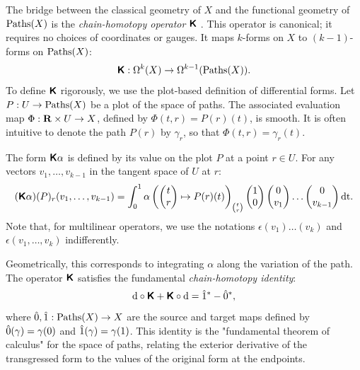   \begin{article}
    \label{subsec:The Chain-Homotopy Operator}
    The bridge between the classical geometry of $X$ and the functional geometry of $\operatorname{Paths}(X)$ is the \emph{chain-homotopy operator} $\boldsymbol{\mathsf{K}}$ \cite{PIZ13}.
    This operator is canonical;
    it requires no choices of coordinates or gauges.
    It maps $k$-forms on $X$ to $(k-1)$-forms on $\operatorname{Paths}(X)$:
    \[
      \boldsymbol{\mathsf{K}} : \Omega^k(X) \to \Omega^{k-1}(\operatorname{Paths}(X)).
      \]
    To define $\boldsymbol{\mathsf{K}}$ rigorously,
    we use the plot-based definition of differential forms.
    Let $P: U \to \operatorname{Paths}(X)$ be a plot of the space of paths.
    The associated evaluation map $\Phi: {\mathbf{R}} \times U \to X$,
    defined by $\Phi(t,r) = P(r)(t)$,
    is smooth.
    It is often intuitive to denote the path $P(r)$ by $\gamma_r$,
    so that $\Phi(t,r) = \gamma_r(t)$.
    
    The form $\boldsymbol{\mathsf{K}}\alpha$ is defined by its value on the plot $P$ at a point $r \in U$.
    For any vectors $v_1, \dots, v_{k-1}$ in the tangent space of $U$ at $r$:
    \[
      (\boldsymbol{\mathsf{K}}\alpha)(P)_r(v_1, \dots, v_{k-1}) = \int_0^1 \alpha\left(\begin{pmatrix}t \\ r\end{pmatrix} \mapsto P(r)(t) \right)_{t \choose r}\begin{pmatrix}1 \\ 0\end{pmatrix} \begin{pmatrix}0 \\ v_1\end{pmatrix} \dots \begin{pmatrix}0 \\ v_{k-1}\end{pmatrix} \mathrm{dt}.
      \]
    Note that,
    for multilinear operators,
    we use the notations $\epsilon(v_1)\dots(v_k)$ and $\epsilon(v_1,\dots,v_k)$ indifferently.
    
    Geometrically,
    this corresponds to integrating $\alpha$ along the variation of the path.
    The operator $\boldsymbol{\mathsf{K}}$ satisfies the fundamental \emph{chain-homotopy identity}:
    \[
      \mathrm{d} \circ \boldsymbol{\mathsf{K}} + \boldsymbol{\mathsf{K}} \circ \mathrm{d} = \hat 1^* - \hat 0^*,
      \]
    where $\hat 0, \hat 1: \operatorname{Paths}(X) \to X$ are the source and target maps defined by $\hat 0(\gamma) = \gamma(0)$ and $\hat 1(\gamma) = \gamma(1)$.
    This identity is the "fundamental theorem of calculus" for the space of paths,
    relating the exterior derivative of the transgressed form to the values of the original form at the endpoints.
    

\end{article}
